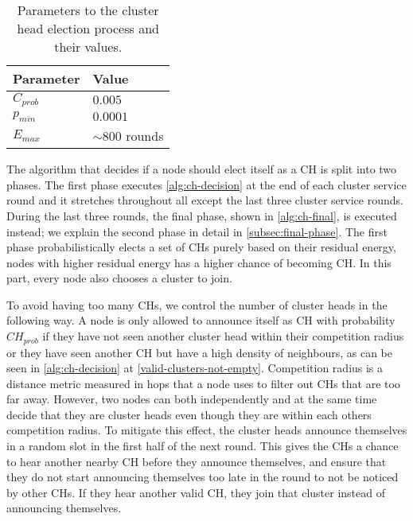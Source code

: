 \begin{table}[bt]
\centering
\caption{Parameters to the cluster head election process and their values.}
\label{tab:ch-heed-election-parameters}
\begin{tabular}{|l|l|}
\hline
\textbf{Parameter} & \textbf{Value}   \\ \hline
$C_{prob}$         & $0.005$      \\ \hline
$p_{min}$          & $0.0001$        \\ \hline
$E_{max}$          & $\sim$800 rounds \\ \hline
\end{tabular}
\end{table}



The algorithm that decides if a node should elect itself as a CH is split into two phases. The first phase executes \cref{alg:ch-decision} at the end of each cluster service round and it stretches throughout all except the last three cluster service rounds. During the last three rounds, the final phase, shown in \cref{alg:ch-final}, is executed instead; we explain the second phase in detail in \cref{subsec:final-phase}. The first phase probabilistically elects a set of CHs purely based on their residual energy, nodes with higher residual energy has a higher chance of becoming CH. In this part, every node also chooses a cluster to join.

To avoid having too many CHs, we control the number of cluster heads in the following way. A node is only allowed to announce itself as CH with probability $CH_{prob}$ if they have not seen another cluster head within their competition radius or they have seen another CH but have a high density of neighbours, as can be seen in \cref{alg:ch-decision} at \cref{valid-clusters-not-empty}. Competition radius is a distance metric measured in hops that a node uses to filter out CHs that are too far away. However, two nodes can both independently and at the same time decide that they are cluster heads even though they are within each others competition radius. To mitigate this effect, the cluster heads announce themselves in a random slot in the first half of the next round. This gives the CHs a chance to hear another nearby CH before they announce themselves, and ensure that they do not start announcing themselves too late in the round to not be noticed by other CHs. If they hear another valid CH, they join that cluster instead of announcing themselves.

